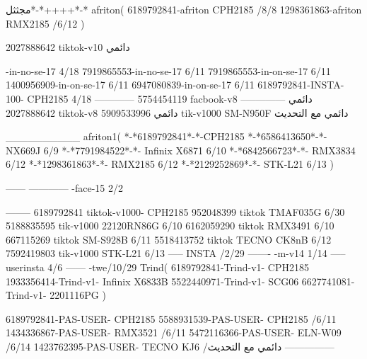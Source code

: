 مجثثل*-*++++*-*
afriton(
6189792841-afriton CPH2185  /8/8
1298361863-afriton RMX2185  /6/12
)

2027888642 tiktok-v10
دائمي

-in-no-se-17 4/18
7919865553-in-no-se-17 6/11
7919865553-in-on-se-17 6/11
1400956909-in-on-se-17 6/11
6947080839-in-on-se-17 6/11
6189792841-INSTA-100- CPH2185 4/18
------------
5754454119 facbook-v8
دائمي
--------------
2027888642 tiktok-v8
دائمي
5909533996 tik-v1000  SM-N950F
دائمي مع التحديث

__________
afriton1(
*-*6189792841*-*-CPH2185
*-*6586413650*-*- NX669J  6/9
*-*7791984522*-*- Infinix X6871  6/10
*-*6842566723*-*- RMX3834  6/12
*-*1298361863*-*- RMX2185  6/12
*-*2129252869*-*- STK-L21  6/13
)


------
------------
-face-15 2/2

--------
6189792841 tiktok-v1000- CPH2185 
952048399 tiktok TMAF035G  6/30
5188835595 tik-v1000 22120RN86G  6/10
6162059290 tiktok RMX3491  6/10
667115269 tiktok  SM-S928B  6/11
5518413752 tiktok  TECNO CK8nB  6/12
7592419803 tik-v1000 STK-L21  6/13
-----
 INSTA /2/29
-------
-m-v14 1/14
-----
userinsta 4/6
------
-twe/10/29
Trind(
6189792841-Trind-v1- CPH2185 
1933356414-Trind-v1-   Infinix X6833B \6
5522440971-Trind-v1- SCG06 \6
6627741081-Trind-v1- 2201116PG \6
)


6189792841-PAS-USER- CPH2185 
5588931539-PAS-USER- CPH2185  /6/11
1434336867-PAS-USER- RMX3521  /6/11
5472116366-PAS-USER- ELN-W09  /6/14
1423762395-PAS-USER- TECNO KJ6  /دائمي مع التحديث
    ---------------
